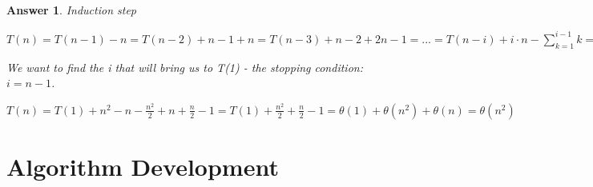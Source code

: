 \documentclass[a4paper]{article}
\theoremstyle{remarksStyle}
\theoremstyle{questionStyle}
\theoremstyle{answerStyle}
\newtheorem{answer}{Answer}
\begin{document}
\begin{answer}
\item Induction step

\item $T(n) = T(n - 1) - n = T(n-2) + n - 1 +n = T(n - 3) + n- 2 +2n-1 = ... = T(n-i) + i \cdot n - \sum_{k=1}^{i-1} k = T(n-i) + i \cdot n - \frac{i \cdot (i-1)}{2}$
\item We want to find the i that will bring us to T(1) - the stopping condition: $ i = n - 1 $.
\item $T(n) = T(1) + n^2 - n - \frac{n^2}{2} + n + \frac{n}{2} - 1= T(1) + \frac{n^2}{2} + \frac{n}{2} - 1= \theta(1) + \theta(n^2) + \theta(n) = \theta(n^2)$

\end{answer}

\newpage
\section{Algorithm Development}
\end{document}
